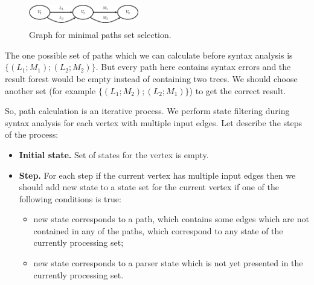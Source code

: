 \begin{figure}
    \begin{center}
        \includegraphics[width=4.8cm,height=1.1cm]{../../graphs/paths.eps}
        \caption{Graph for minimal paths set selection.}
        \label{pic6}
    \end{center}
\end{figure}

The one possible set of paths which we can calculate before syntax analysis is $\{(L_1; M_1); (L_2; M_2)\}$. 
But every path here contains syntax errors and the result forest would be empty instead of containing 
two trees. We should choose another set (for example $\{(L_1; M_2); (L_2; M_1)\}$) to get the correct result. 

So, path calculation is an iterative process. We perform state filtering during syntax analysis for each vertex 
with multiple input edges. Let describe the steps of the process:

\begin{itemize}
    \item \textbf{Initial state.} Set of states for the vertex is empty. 
    \item \textbf{Step.} For each step if the current vertex has multiple input edges then we should add new 
                 state to a state set for the current vertex if one of the following conditions is true:
    \begin{itemize}
        \item new state corresponds to a path, which contains some edges which are not contained in any of the paths, which correspond to any state of the currently processing set;
        \item new state corresponds to a parser state which is not yet presented in the currently processing set.
    \end{itemize}

\end{itemize}

